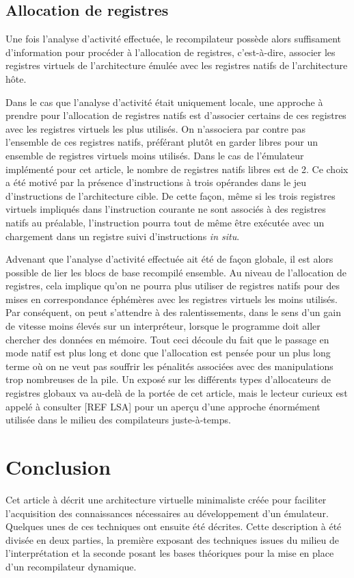 \documentclass{article} %
\begin{document}
\subsection{Allocation de registres}
Une fois l'analyse d'activité effectuée, le recompilateur possède alors suffisament d'information pour procéder à l'allocation de registres, c'est-à-dire, associer les registres virtuels de l'architecture émulée avec les registres natifs de l'architecture hôte.

Dans le cas que l'analyse d'activité était uniquement locale, une approche à prendre pour l'allocation de registres natifs est d'associer certains de ces registres avec les registres virtuels les plus utilisés. On n'associera par contre pas l'ensemble de ces registres natifs, préférant plutôt en garder libres pour un ensemble de registres virtuels moins utilisés. Dans le cas de l'émulateur implémenté pour cet article, le nombre de registres natifs libres est de 2. Ce choix a été motivé par la présence d'instructions à trois opérandes dans le jeu d'instructions de l'architecture cible. De cette façon, même si les trois registres virtuels impliqués dans l'instruction courante ne sont associés à des registres natifs au préalable, l'instruction pourra tout de même être exécutée avec un chargement dans un registre suivi d'instructions \textit{in situ}.

Advenant que l'analyse d'activité effectuée ait été de façon globale, il est alors possible de lier les blocs de base recompilé ensemble. Au niveau de l'allocation de registres, cela implique qu'on ne pourra plus utiliser de registres natifs pour des mises en correspondance éphémères avec les registres virtuels les moins utilisés. Par conséquent, on peut s'attendre à des ralentissements, dans le sens d'un gain de vitesse moins élevés sur un interpréteur, lorsque le programme doit aller chercher des données en mémoire. Tout ceci découle du fait que le passage en mode natif est plus long et donc que l'allocation est pensée pour un plus long terme où on ne veut pas souffrir les pénalités associées avec des manipulations trop nombreuses de la pile. Un exposé sur les différents types d'allocateurs de registres globaux va au-delà de la portée de cet article, mais le lecteur curieux est appelé à consulter [REF LSA] pour un aperçu d'une approche énormément utilisée dans le milieu des compilateurs juste-à-temps.

\section{Conclusion}
Cet article à décrit une architecture virtuelle minimaliste créée pour faciliter l'acquisition des connaissances nécessaires au développement d'un émulateur. Quelques unes de ces techniques ont ensuite été décrites. Cette description à été divisée en deux parties, la première exposant des techniques issues du milieu de l'interprétation et la seconde posant les bases théoriques pour la mise en place d'un recompilateur dynamique.
\end{document}
